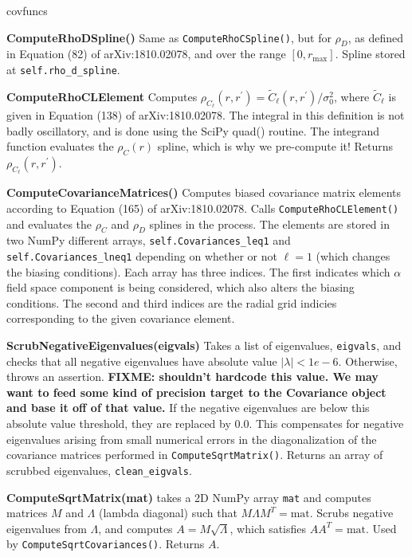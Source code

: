 \documentclass[10pt,a4paper]{article}
\begin{document}
\begin{labeling}{covfuncs}
	\item[\textbf{ComputeRhoDSpline()}] Same as \verb|ComputeRhoCSpline()|, but for $\rho_D$, as defined in Equation (82) of arXiv:1810.02078, and over the range $[0,r_\text{max}]$. Spline stored at \verb|self.rho_d_spline|.
	
	\item[\textbf{ComputeRhoCLElement}] Computes $\rho_{C_\ell}(r,r^\prime) = \tilde{C}_\ell(r,r^\prime)/\sigma_0^2$, where  $\tilde{C}_\ell$ is given in Equation (138) of arXiv:1810.02078. The integral in this definition is not badly oscillatory, and is done using the SciPy quad() routine. The integrand function evaluates the $\rho_C(r)$ spline, which is why we pre-compute it! Returns $\rho_{C_\ell}(r,r^\prime)$.
	
	\item[\textbf{ComputeCovarianceMatrices()}] Computes biased covariance matrix elements according to Equation (165) of arXiv:1810.02078. Calls \verb|ComputeRhoCLElement()| and evaluates the $\rho_C$ and $\rho_D$ splines in the process. The elements are stored in two NumPy different arrays, \verb|self.Covariances_leq1| and \verb|self.Covariances_lneq1| depending on whether or not $\ell=1$ (which changes the biasing conditions). Each array has three indices. The first indicates which $\alpha$ field space component is being considered, which also alters the biasing conditions. The second and third indices are the radial grid indicies corresponding to the given covariance element.
	
	\item[\textbf{ScrubNegativeEigenvalues(eigvals)}] Takes a list of eigenvalues, \verb|eigvals|, and checks that all negative eigenvalues have absolute value $|\lambda|<1e-6$. Otherwise, throws an assertion. \textbf{FIXME: shouldn't hardcode this value. We may want to feed some kind of precision target to the Covariance object and base it off of that value.} If the negative eigenvalues are below this absolute value threshold, they are replaced by $0.0$. This compensates for negative eigenvalues arising from small numerical errors in the diagonalization of the covariance matrices performed in \verb|ComputeSqrtMatrix()|. Returns an array of scrubbed eigenvalues, \verb|clean_eigvals|.
	
	\item[\textbf{ComputeSqrtMatrix(mat)}] takes a 2D NumPy array \verb|mat| and computes matrices $M$ and $\Lambda$ (lambda diagonal) such that $M\Lambda M^T = \text{mat}$. Scrubs negative eigenvalues from $\Lambda$, and computes $A = M\sqrt{\Lambda}$, which satisfies $AA^T = \text{mat}$. Used by \verb|ComputeSqrtCovariances()|. Returns $A$.
	

\end{labeling}
\end{document}
